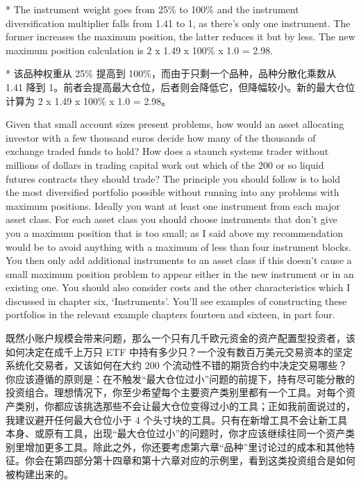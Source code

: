 \begin{englishblock}* The instrument weight goes from 25\% to 100\% and the instrument diversification multiplier falls from 1.41 to 1, as there's only one instrument. The former increases the maximum position, the latter reduces it but by less. The new maximum position calculation is 2 x 1.49 x 100\% x 1.0 = 2.98. \end{englishblock}

\begin{chineseblock}* 该品种权重从 25\% 提高到 100\%，而由于只剩一个品种，品种分散化乘数从 1.41 降到 1。前者会提高最大仓位，后者则会降低它，但降幅较小。新的最大仓位计算为 2 x 1.49 x 100\% x 1.0 = 2.98。 \end{chineseblock}



\begin{englishblock} Given that small account sizes present problems, how would an asset allocating investor with a few thousand euros decide how many of the thousands of exchange traded funds to hold? How does a staunch systems trader without millions of dollars in trading capital work out which of the 200 or so liquid futures contracts they should trade? The principle you should follow is to hold the most diversified portfolio possible without running into any problems with maximum positions. Ideally you want at least one instrument from each major asset class. For each asset class you should choose instruments that don't give you a maximum position that is too small; as I said above my recommendation would be to avoid anything with a maximum of less than four instrument blocks. You then only add additional instruments to an asset class if this doesn't cause a small maximum position problem to appear either in the new instrument or in an existing one. You should also consider costs and the other characteristics which I discussed in chapter six, ‘Instruments'. You'll see examples of constructing these portfolios in the relevant example chapters fourteen and sixteen, in part four. \end{englishblock}

\begin{chineseblock} \noindent 既然小账户规模会带来问题，那么一个只有几千欧元资金的资产配置型投资者，该如何决定在成千上万只 ETF 中持有多少只？一个没有数百万美元交易资本的坚定系统化交易者，又该如何在大约 200 个流动性不错的期货合约中决定交易哪些？你应该遵循的原则是：在不触发“最大仓位过小”问题的前提下，持有尽可能分散的投资组合。理想情况下，你至少希望每个主要资产类别里都有一个工具。对每个资产类别，你都应该挑选那些不会让最大仓位变得过小的工具；正如我前面说过的，我建议避开任何最大仓位小于 4 个头寸块的工具。只有在新增工具不会让新工具本身、或原有工具，出现“最大仓位过小”的问题时，你才应该继续往同一个资产类别里增加更多工具。除此之外，你还要考虑第六章“品种”里讨论过的成本和其他特征。你会在第四部分第十四章和第十六章对应的示例里，看到这类投资组合是如何被构建出来的。\end{chineseblock}

